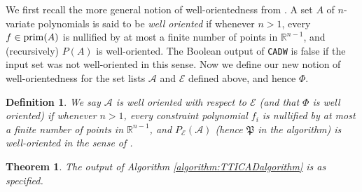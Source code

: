 \documentclass{article}
\def\R {\ensuremath{\mathbb{R}}}
\newtheorem{definition}{Definition}
\newtheorem{theorem}{Theorem}
\begin{document}
We first recall the more general notion of well-orientedness from \cite{McCallum1998}.  A set $A$ of
$n$-variate polynomials is said to be {\em well oriented} if whenever $n > 1$,
every $f \in {\rm prim}(A)$ is nullified by at most a finite number of points
in $\R^{n-1}$, and (recursively) $P(A)$ is well-oriented.  The Boolean output of \texttt{CADW} is false if the input set was not well-oriented in this sense. 
Now we define our new notion of well-orientedness for the set lists $\mathcal{A}$ and $\mathcal{E}$ defined above, and hence $\Phi$.
\begin{definition}\label{def:tticadwellorientedness}
We say $\mathcal{A}$ is {\em well oriented with respect to} $\mathcal{E}$ (and that $\Phi$ is {\em well oriented}) if whenever $n>1$, every constraint polynomial $f_i$ is nullified by at most a finite number of points in $\R^{n-1}$, and $P_{\mathcal{E}}(\mathcal{A})$ 
(hence $\mathfrak{P}$ in the algorithm) is well-oriented in the sense of \cite{McCallum1998}.
\end{definition}
\begin{theorem}
The output of Algorithm \ref{algorithm:TTICADalgorithm} is as specified.  
\end{theorem}
\end{document}
